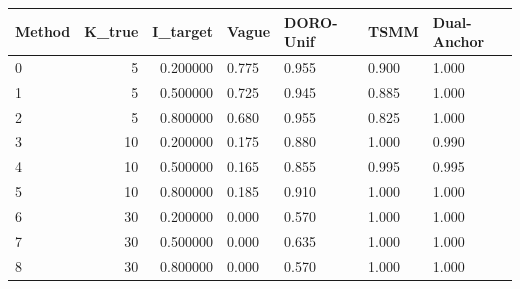 \begin{tabular}{lrrllll}
\toprule
Method & K_true & I_target & Vague & DORO-Unif & TSMM & Dual-Anchor \\
\midrule
0 & 5 & 0.200000 & 0.775 & 0.955 & 0.900 & 1.000 \\
1 & 5 & 0.500000 & 0.725 & 0.945 & 0.885 & 1.000 \\
2 & 5 & 0.800000 & 0.680 & 0.955 & 0.825 & 1.000 \\
3 & 10 & 0.200000 & 0.175 & 0.880 & 1.000 & 0.990 \\
4 & 10 & 0.500000 & 0.165 & 0.855 & 0.995 & 0.995 \\
5 & 10 & 0.800000 & 0.185 & 0.910 & 1.000 & 1.000 \\
6 & 30 & 0.200000 & 0.000 & 0.570 & 1.000 & 1.000 \\
7 & 30 & 0.500000 & 0.000 & 0.635 & 1.000 & 1.000 \\
8 & 30 & 0.800000 & 0.000 & 0.570 & 1.000 & 1.000 \\
\bottomrule
\end{tabular}

